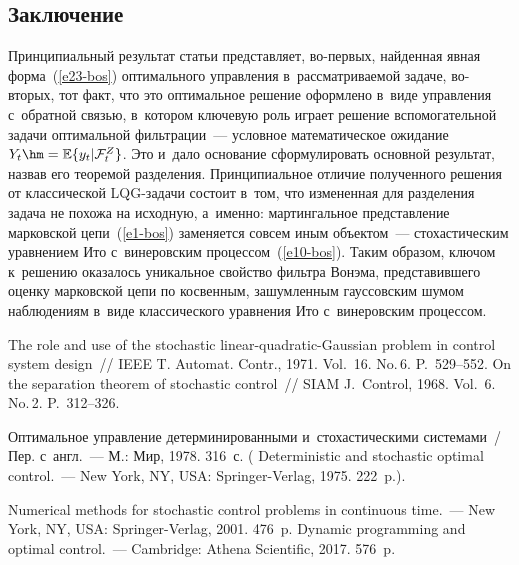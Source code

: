 \begin{multicols}{2}
\vspace*{-18pt}

\section{Заключение}

\vspace*{-2pt}
     
     Принципиальный результат статьи представляет, во-первых, найденная 
явная форма~(\ref{e23-bos}) оптимального управления в~рассматриваемой 
задаче, во-вторых, тот факт, что это оптимальное решение оформлено в~виде 
управления с~обратной связью, в~котором ключевую роль играет решение 
вспомогательной задачи оптимальной фильтрации~--- условное 
математическое ожидание $Y_t\hm= \mathbb{E}\{ y_t\vert \mathcal{F}_t^Z\}$. 
Это и~дало основание сформулировать основной\linebreak
 результат, назвав его 
теоремой разделения. Принципиальное отличие полученного решения от 
класси\-че\-ской LQG-за\-да\-чи состоит в~том, что измененная для разделения 
задача не похожа на исходную, а~именно: мартингальное представление 
марковской цепи~(\ref{e1-bos}) заменяется совсем иным объектом~--- 
стохастическим уравнением Ито с~винеровским процессом~(\ref{e10-bos}). 
Таким образом, ключом к~решению оказалось уникальное свойство фильтра 
Вонэма, представившего оценку марковской цепи по косвенным, 
зашумленным гауссовским шумом наблюдениям в~виде классического 
уравнения Ито с~винеровским процессом.
     
{\small\frenchspacing
{%
\begin{thebibliography}{99}
 The role and use of the stochastic linear-quadratic-Gaussian problem in control 
system design~// IEEE T. Automat. Contr., 1971. Vol.~16. No.\,6. P.~529--552.
 On the separation theorem of stochastic control~// SIAM J.~Control, 1968. 
Vol.~6. No.\,2. P.~312--326.

 Оптимальное управление детерминированными 
и~стохастическими системами~/ Пер. с~англ.~--- М.: Мир, 1978. 316~с. 
( Deterministic and stochastic optimal control.~--- New 
York, NY, USA: Springer-Verlag, 1975. 222~p.).

 Numerical methods for stochastic control problems in 
continuous time.~--- New York, NY, USA: Springer-Verlag, 2001. 476~p.
 Dynamic programming and optimal control.~--- Cambridge: Athena 
Scientific, 2017. 576~p.


\end{thebibliography}}}
\end{multicols}

